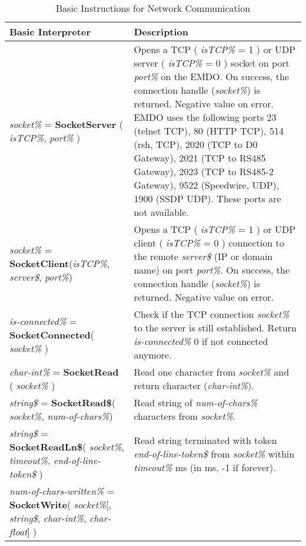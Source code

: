 \begin{table}[h!]
\centering
\caption{Basic Instructions for Network Communication}
\label{Basic_Instructions_for_Network_Communication}
\begin{tabular}{|p{4cm}|p{10cm}|}
\hline
\textbf{Basic Interpreter} & \textbf{Description}
\\ \hline
\textit{socket\%} = \textbf{SocketServer} ( \textit{isTCP\%}, \textit{port\%} )
&
Opens a TCP ( \textit{isTCP\%} = 1 ) or UDP server ( \textit{isTCP\%} = 0 ) socket on port \textit{port\%} on the EMDO. On success, the connection handle (\textit{socket\%}) is returned. Negative value on error.\newline
EMDO uses the following ports 23 (telnet TCP), 80 (HTTP TCP), 514 (rsh, TCP), 2020 (TCP to D0 Gateway), 2021 (TCP to RS485 Gateway), 2023 (TCP to RS485-2 Gateway), 9522 (Speedwire, UDP), 1900 (SSDP UDP). These ports are not available.
\\ \hline
\textit{socket\%} = \textbf{SocketClient}(\textit{isTCP\%}, \textit{server\$}, \textit{port\%})
& Opens a TCP ( \textit{isTCP\%} = 1 ) or UDP client ( \textit{isTCP\%} = 0 ) connection to the remote \textit{server\$} (IP or domain name) on port \textit{port\%}. On success, the connection handle (\textit{socket\%}) is returned. Negative value on error.\newline
\\ \hline
\textit{is-connected\%} = \textbf{SocketConnected}( \textit{socket\%} ) 
& Check if the TCP connection \textit{socket\%} to the server is still established. Return \textit{is-connected\%} 0 if not connected anymore.
\\ \hline
\textit{char-int\%} = \textbf{SocketRead} ( \textit{socket\%} )
& Read one character from \textit{socket\%} and return character (\textit{char-int\%}).
\\ \hline
\textit{string\$} = \textbf{SocketRead\$}( \textit{socket\%}, \textit{num-of-chars\%})
& Read string of \textit{num-of-chars\%} characters from \textit{socket\%}. 
\\ \hline
\textit{string\$} = \textbf{SocketReadLn\$}( \textit{socket\%}, \textit{timeout\%}, \textit{end-of-line-token\$} )
& Read string terminated with token \textit{end-of-line-token\$} from \textit{socket\%} within \textit{timeout\%} ms (in ms, -1 if forever).\newline 
\\ \hline
\textit{num-of-chars-written\%} = \textbf{SocketWrite}( \textit{socket\%}[, \textit{string\$}, \textit{char-int\%}, \textit{char-float}] )

\end{tabular}
\end{table}
